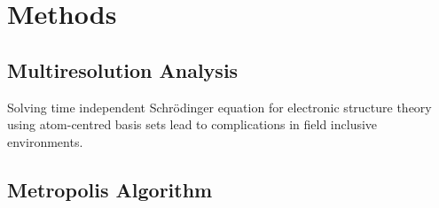 \section{Methods}

\subsection{Multiresolution Analysis}
Solving time independent Schr\"odinger equation for electronic structure theory using atom-centred basis sets lead to complications in field inclusive environments. 

\subsection{Metropolis Algorithm}

